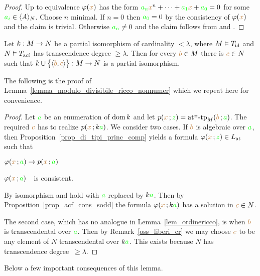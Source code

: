 \begin{proof}
Up to equivalence $\phi({\mr x})$ has the form ${\gr a_n}{\mr x}^n + \dots + {\gr a_1} {\mr x} + {\gr a_0}=0$ for some ${\gr a_i}\in\<A\>_N$.
%
Choose $n$ minimal.
%
If $n=0$ then ${\gr a_0}=0$ by the consistency of $\phi({\mr x})$ and the claim is trivial.
%
Otherwise ${\gr a_n}\neq0$ and the claim follows from  and .
\end{proof}

\begin{lemma}\label{lem_acf_ricco_nonnumer}
Let $k:M\imp N$ be a partial isomorphism of cardinality $<\lambda$, where $M\models T_{\rm id}$ and $N\models T_{\rm acf}$ has transcendence degree $\ge\lambda$.
%
Then for every ${\mr b}\in M$ there is ${\mr c}\in N$ such that $k\cup\big\{\<{\mr b},{\mr c}\>\big\}:M\imp N$ is a partial isomorphism.
\end{lemma}

The following is the proof of Lemma~\ref{lemma_modulo_divisibile_ricco_nonnumer} which we repeat here for convenience.

\begin{proof}
Let ${\gr a}$ be an enumeration of $\dom k$ and let $p({\mr x}\,;{\gr z})=\atpmtp_M({\mr b}\,;{\gr a})$.
%
The required ${\mr c}$ has to realize $p({\mr x}\,;k{\gr a})$.
%
We consider two cases.
%
If ${\mr b}$ is algebraic over ${\gr a}$, then Proposition~\ref{prop_di_tipi_princ_comp} yields a formula $\phi({\mr x}\,;{\gr z})\in L_{\rm at}$ such that 

\noindent{}\hspace{5ex} $\phi({\mr x}\,;{\gr a})\imp p({\mr x}\,;{\gr a})$

\noindent{}\hspace{5ex} $\phi({\mr x}\,;{\gr a})$\ \ is consistent.

By isomorphism  and  hold with ${\gr a}$ replaced by $k{\gr a}$.
%
Then by Proposition~\ref{prop_acf_cons_sodd} the formula $\phi({\mr x}\,;k{\gr a})$ has a solution in ${\mr c}\in N$.

The second case, which has no analogue in Lemma~\ref{lem_ordinericco}, is when ${\mr b}$ is transcendental over ${\gr a}$.
%
Then by  Remark~\ref{oss_liberi_cr} we may choose ${\mr c}$ to be any element of $N$ transcendental over $k{\gr a}$.
%
This exists because $N$ has transcendence degree $\ \ge\lambda$.
\end{proof}

Below a few important consequences of this lemma.


